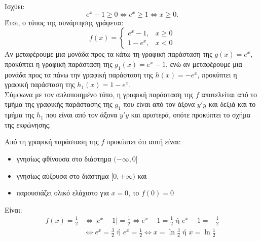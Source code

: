 \begin{alist}
\item Ισχύει:
\[e^x - 1 \ge 0 \Leftrightarrow e^x \ge 1 \Leftrightarrow x \ge 0.\]
Έτσι, ο τύπος της συνάρτησης γράφεται:
\[f(x) = \begin{cases} e^x - 1, & x \ge 0 \\ 1 - e^x, & x < 0 \end{cases}\]
Αν μεταφέρουμε μια μονάδα προς τα κάτω τη γραφική παράσταση της $g(x) = e^x$, προκύπτει η γραφική παράσταση της $g_1(x) = e^x - 1$, ενώ αν μεταφέρουμε μια μονάδα προς τα πάνω την γραφική παράσταση της $h(x) = -e^x$, προκύπτει η γραφική παράσταση της $h_1(x) = 1 - e^x$. \\
Σύμφωνα με τον απλοποιημένο τύπο, η γραφική παράσταση της $f$ αποτελείται από το τμήμα της γραφικής παράστασης της $g_1$ που είναι από τον άξονα $y'y$ και δεξιά και το τμήμα της $h_1$ που είναι από τον άξονα $y'y$ και αριστερά, οπότε προκύπτει το σχήμα της εκφώνησης.
\begin{center}
\end{center}
\item Από τη γραφική παράσταση της $f$ προκύπτει ότι αυτή είναι:
\begin{itemize}
\item γνησίως φθίνουσα στο διάστημα $(-\infty, 0]$
\item γνησίως αύξουσα στο διάστημα $[0, +\infty)$ και
\item παρουσιάζει ολικό ελάχιστο για $x = 0$, το $f(0) = 0$
\end{itemize}
\item Είναι:
\begin{align*}
f(x) = \frac{1}{2} &\Leftrightarrow |e^x - 1| = \frac{1}{2} \Leftrightarrow e^x - 1 = \frac{1}{2} \text{ ή } e^x - 1 = -\frac{1}{2} \\
&\Leftrightarrow e^x = \frac{3}{2} \text{ ή } e^x = \frac{1}{2} \Leftrightarrow x = \ln\frac{3}{2} \text{ ή } x = \ln\frac{1}{2}
\end{align*}
\end{alist}

